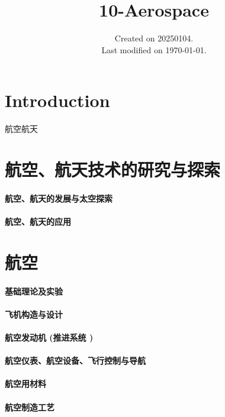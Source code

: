 \documentclass[UTF8]{../ApplicationUniverse}
\begin{document}
\title{10-Aerospace}
\date{Created on 20250104.\\   Last modified on \today.}
\maketitle
\tableofcontents


\chapter{Introduction}

航空航天



\chapter{航空、航天技术的研究与探索}
\subsubsection{航空、航天的发展与太空探索}
\subsubsection{航空、航天的应用}




\chapter{航空}
\subsubsection{基础理论及实验}
\subsubsection{飞机构造与设计}
\subsubsection{航空发动机 (推进系统 )}
\subsubsection{航空仪表、航空设备、飞行控制与导航}
\subsubsection{航空用材料}
\subsubsection{航空制造工艺}
\end{document}
